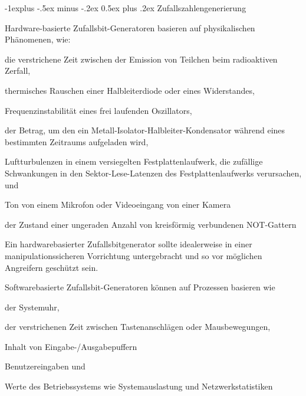 \documentclass[a4paper]{article}
\makeatletter
\renewcommand{\subsection}{\@startsection{subsection}{2}{0mm}%
 {-1explus -.5ex minus -.2ex}%
 {0.5ex plus .2ex}%
 {\normalfont\normalsize\bfseries}}
\makeatother
\begin{document}
\begin{multicols}{3}
      \subsection{Zufallszahlengenerierung}

      \begin{itemize*}
            \item Hardware-basierte Zufallsbit-Generatoren basieren auf physikalischen
            Phänomenen, wie:
            \begin{itemize*}
                  \item die verstrichene Zeit zwischen der Emission von Teilchen beim radioaktiven Zerfall,
                  \item thermisches Rauschen einer Halbleiterdiode oder eines Widerstandes,
                  \item Frequenzinstabilität eines frei laufenden Oszillators,
                  \item der Betrag, um den ein Metall-Isolator-Halbleiter-Kondensator während eines bestimmten Zeitraums aufgeladen wird,
                  \item Luftturbulenzen in einem versiegelten Festplattenlaufwerk, die zufällige Schwankungen in den Sektor-Lese-Latenzen des Festplattenlaufwerks verursachen, und
                  \item Ton von einem Mikrofon oder Videoeingang von einer Kamera
                  \item der Zustand einer ungeraden Anzahl von kreisförmig verbundenen NOT-Gattern
            \end{itemize*}
            \item Ein hardwarebasierter Zufallsbitgenerator sollte idealerweise in einer
            manipulationssicheren Vorrichtung untergebracht und so vor möglichen
            Angreifern geschützt sein.
            \item Softwarebasierte Zufallsbit-Generatoren können auf Prozessen basieren
            wie
            \begin{itemize*}
                  \item der Systemuhr,
                  \item der verstrichenen Zeit zwischen Tastenanschlägen oder Mausbewegungen,
                  \item Inhalt von Eingabe-/Ausgabepuffern
                  \item Benutzereingaben und
                  \item Werte des Betriebssystems wie Systemauslastung und Netzwerkstatistiken

\end{itemize*}
\end{itemize*}
\end{multicols}
\end{document}
